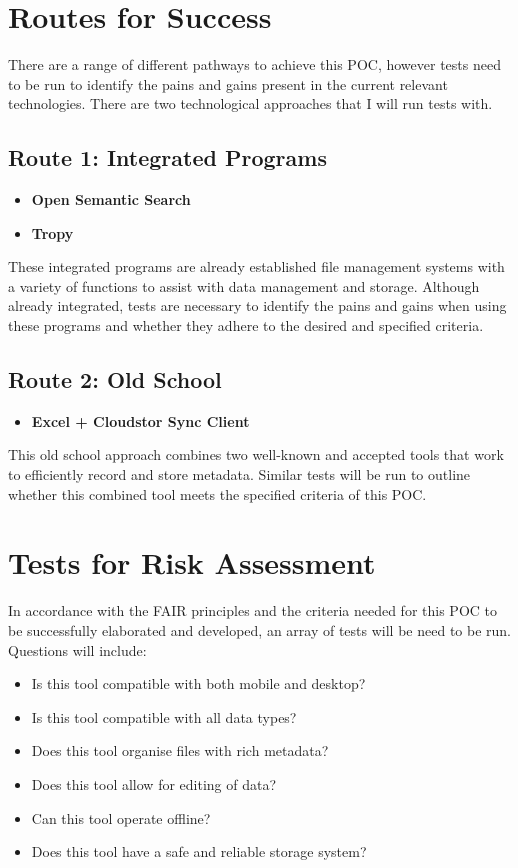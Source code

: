 \documentclass{article}
\begin{document}
\clearpage

\section{Routes for Success}
There are a range of different pathways to achieve this POC, however tests need to be run to identify the pains and gains present in the current relevant technologies. There are two technological approaches that I will run tests with. 
\subsection{Route 1: Integrated Programs}

\begin{itemize}
\item \textbf{Open Semantic Search}
\item \textbf{Tropy}
\end{itemize}
These integrated programs are already established file management systems with a variety of functions to assist with data management and storage. Although already integrated, tests are necessary to identify the pains and gains when using these programs and whether they adhere to the desired and specified criteria.

\subsection{Route 2: Old School}
\begin{itemize}
\item \textbf{Excel + Cloudstor Sync Client}
\end{itemize}
This old school approach combines two well-known and accepted tools that work to efficiently record and store metadata. Similar tests will be run to outline whether this combined tool meets the specified criteria of this POC.

\section{Tests for Risk Assessment}
In accordance with the FAIR principles and the criteria needed for this POC to be successfully elaborated and developed, an array of tests will be need to be run. Questions will include:
\begin{itemize}
\item Is this tool compatible with both mobile and desktop?
\item Is this tool compatible with all data types?
\item Does this tool organise files with rich metadata?
\item Does this tool allow for editing of data?
\item Can this tool operate offline?
\item Does this tool have a safe and reliable storage system?
\end{itemize}
\end{document}
